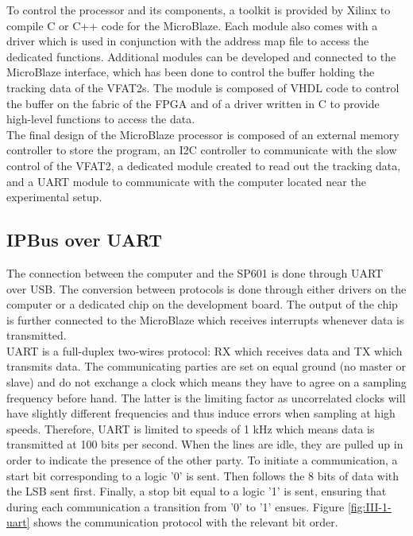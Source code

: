       To control the processor and its components, a toolkit is provided by Xilinx to compile C or C++ code for the MicroBlaze. Each module also comes with a driver which is used in conjunction with the address map file to access the dedicated functions. Additional modules can be developed and connected to the MicroBlaze interface, which has been done to control the buffer holding the tracking data of the VFAT2s. The module is composed of VHDL code to control the buffer on the fabric of the FPGA and of a driver written in C to provide high-level functions to access the data. \\

      The final design of the MicroBlaze processor is composed of an external memory controller to store the program, an I2C controller to communicate with the slow control of the VFAT2, a dedicated module created to read out the tracking data, and a UART module to communicate with the computer located near the experimental setup.

    \subsection{IPBus over UART}

      The connection between the computer and the SP601 is done through UART over USB. The conversion between protocols is done through either drivers on the computer or a dedicated chip on the development board. The output of the chip is further connected to the MicroBlaze which receives interrupts whenever data is transmitted. \\

      UART is a full-duplex two-wires protocol: RX which receives data and TX which transmits data. The communicating parties are set on equal ground (no master or slave) and do not exchange a clock which means they have to agree on a sampling frequency before hand. The latter is the limiting factor as uncorrelated clocks will have slightly different frequencies and thus induce errors when sampling at high speeds. Therefore, UART is limited to speeds of 1 kHz which means data is transmitted at 100 bits per second. When the lines are idle, they are pulled up in order to indicate the presence of the other party. To initiate a communication, a start bit corresponding to a logic '0' is sent. Then follows the 8 bits of data with the LSB sent first. Finally, a stop bit equal to a logic '1' is sent, ensuring that during each communication a transition from '0' to '1' ensues. Figure \ref{fig:III-1-uart} shows the communication protocol with the relevant bit order. \\

